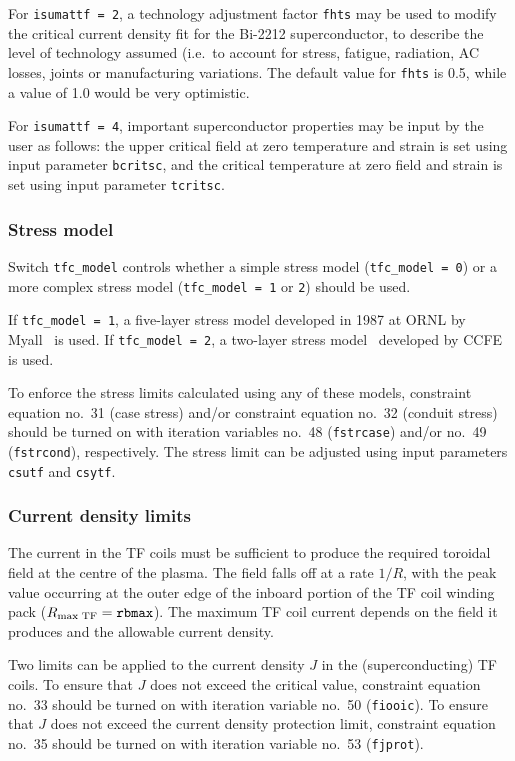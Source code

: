 \documentclass[11pt,a4paper]{report}
\begin{document}
For \texttt{isumattf = 2}, a technology adjustment factor \texttt{fhts} may be
used to modify the critical current density fit for the Bi-2212
superconductor, to describe the level of technology assumed (i.e.\ to account
for stress, fatigue, radiation, AC losses, joints or manufacturing variations.
The default value for \texttt{fhts} is 0.5, while a value of 1.0 would be very
optimistic.

For \texttt{isumattf = 4}, important superconductor properties may be input by
the user as follows: the upper critical field at zero temperature and strain
is set using input parameter \texttt{bcritsc}, and the critical temperature at
zero field and strain is set using input parameter \texttt{tcritsc}.

\subsubsection{Stress model}

Switch \texttt{tfc\_model} controls whether a simple stress model
(\texttt{tfc\_model = 0}) or a more complex stress model (\texttt{tfc\_model =
  1} or \texttt{2}) should be used.

If \texttt{tfc\_model = 1}, a five-layer stress model developed in 1987 at
ORNL by Myall~\cite{Myall} is used. If \texttt{tfc\_model = 2}, a two-layer
stress model~\cite{Morris_tfc} developed by CCFE is used.

To enforce the stress limits calculated using any of these models, constraint
equation no.\ 31 (case stress) and/or constraint equation no.\ 32 (conduit
stress) should be turned on with iteration variables no.\ 48
(\texttt{fstrcase}) and/or no.\ 49 (\texttt{fstrcond}), respectively. The
stress limit can be adjusted using input parameters \texttt{csutf} and
\texttt{csytf}.

\subsubsection{Current density limits}

The current in the TF coils must be sufficient to produce the required
toroidal field at the centre of the plasma. The field falls off at a rate
$1/R$, with the peak value occurring at the outer edge of the inboard portion
of the TF coil winding pack ($R_{\mbox{\scriptsize max TF}} =
\mathtt{rbmax}$). The maximum TF coil current depends on the field it produces
and the allowable current density.

Two limits can be applied to the current density $J$ in the (superconducting)
TF coils. To ensure that $J$ does not exceed the critical value, constraint
equation no.\ 33 should be turned on with iteration variable no.\ 50
(\texttt{fiooic}). To ensure that $J$ does not exceed the current density
protection limit, constraint equation no.\ 35 should be turned on with
iteration variable no.\ 53 (\texttt{fjprot}).
\end{document}
